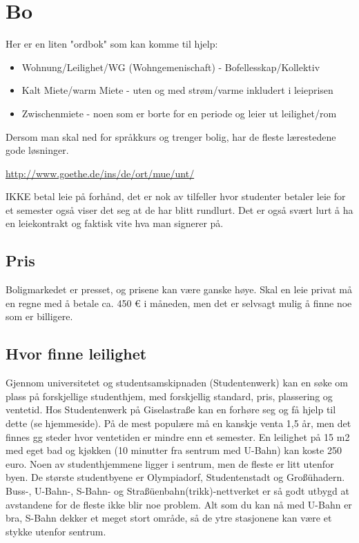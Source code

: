 \chapter{Bo}
Her er en liten "ordbok" som kan komme til hjelp:
\begin{itemize}
\item Wohnung/Leilighet/WG (Wohngemenischaft) - Bofellesskap/Kollektiv
\item Kalt Miete/warm Miete - uten og med strøm/varme inkludert i leieprisen
\item Zwischenmiete - noen som er borte for en periode og leier ut leilighet/rom
\end{itemize}

Dersom man skal ned for språkkurs og trenger bolig, har de fleste lærestedene gode løsninger.

\url{http://www.goethe.de/ins/de/ort/mue/unt/}


IKKE betal leie på forhånd, det er nok av tilfeller hvor studenter betaler leie for et semester også viser det seg at de har blitt rundlurt. 
Det er også svært lurt å ha en leiekontrakt og faktisk vite hva man signerer på.


\section{Pris}
Boligmarkedet er presset, og prisene kan være ganske høye. Skal en leie privat må en regne med å betale ca. 450 \euro{} i måneden, men det er selvsagt mulig å finne noe som er billigere. 

\section{Hvor finne leilighet}
Gjennom universitetet og studentsamskipnaden (Studentenwerk) kan en søke om plass på forskjellige studenthjem, med forskjellig standard, pris, plassering og ventetid. Hos Studentenwerk på Giselastraße kan en forhøre seg og få hjelp til dette (se hjemmeside).
På de mest populære må en kanskje venta 1,5 år, men det finnes gg steder hvor ventetiden er mindre enn et semester. En leilighet på 15 m2 med eget bad og kjøkken (10 minutter fra sentrum med U-Bahn) kan koste 250 euro. Noen av studenthjemmene ligger i sentrum, men de fleste er litt utenfor byen. De største studentbyene er Olympiadorf, Studentenstadt og Großühadern. Buss-, U-Bahn-, S-Bahn- og Straßüenbahn(trikk)-nettverket er så godt utbygd at avstandene for de fleste ikke blir noe problem. Alt som du kan nå med U-Bahn er bra, S-Bahn dekker et meget stort område, så de ytre stasjonene kan være et stykke utenfor sentrum.


